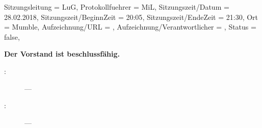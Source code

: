\begin{Protokoll}{
		Sitzungsleitung                 = {LuG},             %
		Protokollfuehrer                = {MiL},              %
		Sitzungszeit/Datum              = {28.02.2018},       %
		Sitzungszeit/BeginnZeit         = {20:05},            %
		Sitzungszeit/EndeZeit           = {21:30},            %
		Ort                             = {Mumble},            %
		Aufzeichnung/URL                = {},                %
		Aufzeichnung/Verantwortlicher   = {},                  %
		Status                          = {false},            %
	}
		
		
	\begin{Anwesenheitsliste}
	\end{Anwesenheitsliste}
		
	\textbf{Der Vorstand ist beschlussfähig.}
		
		
		
		
		
		
		
	\begin{description}
		\item[:] ---
		\item[:] ---
		        
		\newpage
		

\end{description}
\end{Protokoll}
